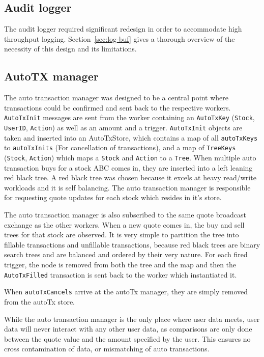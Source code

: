 \subsection{Audit logger}
The audit logger required significant redesign in order to accommodate high throughput logging.
Section~\ref{sec:log-buf} gives a thorough overview of the necessity of this design and its limitations.

\subsection{AutoTX manager}
The auto transaction manager was designed to be a central point where transactions could be confirmed and sent back to the respective workers. \texttt{AutoTxInit} messages are sent from the worker containing an \texttt{AutoTxKey} (\texttt{Stock}, \texttt{UserID}, \texttt{Action}) as well as an amount and a trigger. \texttt{AutoTxInit} objects are taken and inserted into an AutoTxStore, which contains a map of all \texttt{autoTxKeys} to \texttt{autoTxInits} (For cancellation of transactions), and a map of \texttt{TreeKeys} (\texttt{Stock}, \texttt{Action}) which maps a \texttt{Stock} and \texttt{Action} to a \texttt{Tree}.
When multiple auto transaction buys for a stock ABC comes in, they are inserted into a left leaning red black tree.
A red black tree was chosen because it excels at heavy read/write workloads and it is self balancing.
The auto transaction manager is responsible for requesting quote updates for each stock which resides in it’s store.

The auto transaction manager is also subscribed to the same quote broadcast exchange as the other workers.
When a new quote comes in, the buy and sell trees for that stock are observed.
It is very simple to partition the tree into fillable transactions and unfillable transactions, because red black trees are binary search trees and are balanced and ordered by their very nature.
For each fired trigger, the node is removed from both the tree and the map and then the \texttt{AutoTxFilled} transaction is sent back to the worker which instantiated it.

When \texttt{autoTxCancels} arrive at the autoTx manager, they are simply removed from the autoTx store.

While the auto transaction manager is the only place where user data meets, user data will never interact with any other user data, as comparisons are only done between the quote value and the amount specified by the user.
This ensures no cross contamination of data, or mismatching of auto transactions.

